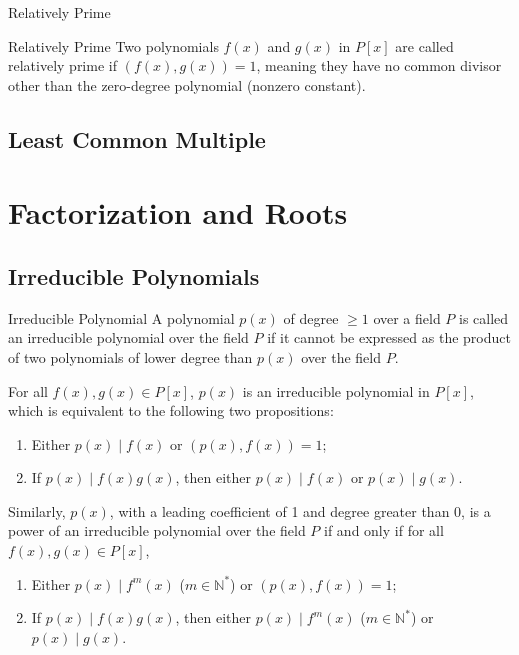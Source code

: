 \documentclass[11pt]{elegantbook}
\begin{document}
\begin{leftbarTitle}{Relatively Prime}\end{leftbarTitle}

\begin{definition}{Relatively Prime}
    Two polynomials \( f(x) \) and \( g(x) \) in \( P[x] \) are called relatively prime 
    if \( (f(x), g(x)) = 1 \), 
    meaning they have no common divisor other than the zero-degree polynomial (nonzero constant).
\end{definition}

\section{Least Common Multiple}


\chapter{Factorization and Roots}

\section{Irreducible Polynomials}
\begin{definition}{Irreducible Polynomial}
    A polynomial \( p(x) \) of degree \( \geq 1 \) over a field \( P \) 
    is called an irreducible polynomial over the field \( P \) 
    if it cannot be expressed as the product of two polynomials of 
    lower degree than \( p(x) \) over the field \( P \).
\end{definition}

\begin{proposition}
    For all \(f(x), g(x)\in P[x]\), \(p(x)\) is an irreducible polynomial in \(P[x]\), 
    which is equivalent to the following two propositions:
    \begin{enumerate}
        \item Either \( p(x) \mid f(x) \) or \( \left(p(x), f(x)\right) = 1 \);
        \item If \( p(x) \mid f(x)g(x) \), then either \( p(x) \mid f(x) \) or \( p(x) \mid g(x) \).
    \end{enumerate}

    Similarly, \( p(x) \), with a leading coefficient of 1 and degree greater than 0, 
    is a power of an irreducible polynomial over the field \( P \)
    if and only if for all \( f(x), g(x) \in P[x] \),
    \begin{enumerate}
        \item Either \( p(x) \mid f^{m}(x) \) (\(m\in \mathbb{N}^{*}\)) or \( \left(p(x), f(x)\right) = 1 \);
        \item If \( p(x) \mid f(x)g(x) \), then either \( p(x) \mid f^{m}(x) \) (\(m\in \mathbb{N}^{*}\)) or \( p(x) \mid g(x) \).
    \end{enumerate}
\end{proposition}
\end{document}
